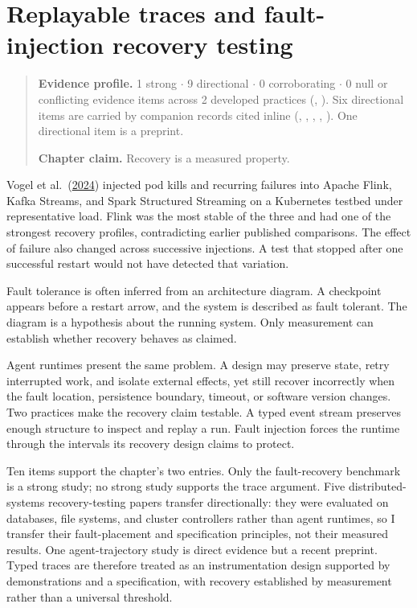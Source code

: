 \chapter{Replayable traces and fault-injection recovery testing}
\label{ch10-replayable-traces-fault-injection-recovery}
\begin{quote}
\textbf{Evidence profile.} 1 strong \(\cdot\) 9 directional \(\cdot\) 0 corroborating \(\cdot\) 0 null or conflicting evidence items across 2 developed practices (, ). Six directional items are carried by companion records cited inline (, , , , ). One directional item is a preprint.

\textbf{Chapter claim.} Recovery is a measured property.
\end{quote}

Vogel et al.~(\href{https://arxiv.org/abs/2404.06203}{2024}) injected pod kills and recurring failures into Apache Flink, Kafka Streams, and Spark Structured Streaming on a Kubernetes testbed under representative load. Flink was the most stable of the three and had one of the strongest recovery profiles, contradicting earlier published comparisons. The effect of failure also changed across successive injections. A test that stopped after one successful restart would not have detected that variation.

Fault tolerance is often inferred from an architecture diagram. A checkpoint appears before a restart arrow, and the system is described as fault tolerant. The diagram is a hypothesis about the running system. Only measurement can establish whether recovery behaves as claimed.

Agent runtimes present the same problem. A design may preserve state, retry interrupted work, and isolate external effects, yet still recover incorrectly when the fault location, persistence boundary, timeout, or software version changes. Two practices make the recovery claim testable. A typed event stream preserves enough structure to inspect and replay a run. Fault injection forces the runtime through the intervals its recovery design claims to protect.

Ten items support the chapter's two entries. Only the fault-recovery benchmark is a strong study; no strong study supports the trace argument. Five distributed-systems recovery-testing papers transfer directionally: they were evaluated on databases, file systems, and cluster controllers rather than agent runtimes, so I transfer their fault-placement and specification principles, not their measured results. One agent-trajectory study is direct evidence but a recent preprint. Typed traces are therefore treated as an instrumentation design supported by demonstrations and a specification, with recovery established by measurement rather than a universal threshold.

